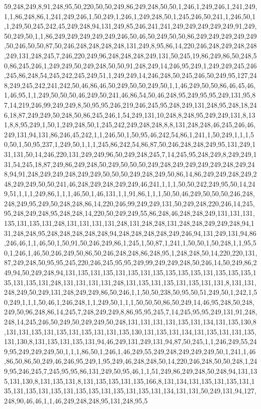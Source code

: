 59,248,249,8,91,248,95,50,220,50,50,249,86,249,248,50,50,1,246,1,249,246,1,241,249,1,1,86,248,86,1,241,249,246,1,50,249,1,246,1,249,248,50,1,245,246,50,241,1,246,50,1,1,249,50,245,242,45,249,248,94,131,249,85,246,241,241,249,249,249,249,249,91,249,50,249,50,1,1,86,249,249,249,249,249,246,50,46,50,249,50,50,86,249,249,249,249,249,50,246,50,50,87,50,246,248,248,248,248,131,249,8,95,86,14,220,246,248,249,248,248,249,131,248,245,7,246,220,249,96,248,248,248,249,131,50,245,19,86,249,86,50,248,50,86,245,246,1,249,249,50,249,248,50,50,91,248,249,14,246,95,249,1,249,249,245,246,245,86,248,54,245,242,245,249,51,1,249,249,14,246,248,50,245,246,50,249,95,127,248,249,245,242,241,242,50,46,86,46,50,249,50,50,249,50,1,1,46,249,50,50,86,46,45,46,1,46,95,1,1,249,50,50,50,46,249,50,241,46,86,54,50,46,248,95,249,95,95,249,131,95,87,14,219,246,99,249,249,8,50,95,95,246,219,246,245,95,248,249,131,248,95,248,18,246,18,87,249,249,50,248,50,86,245,246,1,54,249,131,10,248,8,248,95,249,249,131,8,131,8,8,95,249,1,50,1,249,248,50,1,245,242,249,248,248,8,8,131,248,248,46,245,246,46,249,131,94,131,86,246,45,242,1,1,246,50,1,50,95,46,242,54,86,1,241,1,50,249,1,1,1,50,50,1,50,95,237,1,249,50,1,1,1,245,86,242,54,86,87,50,246,248,248,249,95,131,249,131,131,50,14,246,220,131,249,249,96,50,249,248,245,7,14,245,95,248,249,8,249,249,131,54,245,18,87,249,86,249,248,50,249,50,50,50,249,248,249,249,249,249,248,249,248,94,91,248,249,249,248,249,249,50,50,50,249,248,249,50,86,14,86,249,249,248,249,248,249,249,50,50,241,46,248,249,248,249,249,46,241,1,1,1,50,50,242,249,95,50,14,249,51,1,1,1,249,86,1,1,1,46,50,1,46,131,1,1,91,86,1,1,1,50,50,46,249,50,50,50,246,248,248,249,95,249,50,248,248,86,14,220,246,99,249,249,131,50,249,248,220,246,14,245,95,248,249,248,95,248,248,14,220,50,249,249,55,86,248,46,248,248,249,131,131,131,135,131,135,131,248,131,131,131,131,248,131,248,248,131,248,248,249,249,248,94,131,248,248,95,248,248,248,248,248,94,248,248,248,248,249,246,94,131,249,131,94,86,246,46,1,1,46,50,1,50,91,50,246,249,86,1,245,1,50,87,1,241,1,50,50,1,50,248,1,1,95,50,1,246,1,46,50,246,249,50,86,50,246,248,248,86,248,95,1,248,248,50,14,220,220,131,87,249,248,50,95,95,245,220,246,245,95,95,249,99,249,249,248,50,246,14,50,249,86,249,94,50,249,248,94,131,135,131,135,131,135,131,135,135,135,135,131,135,135,135,135,131,135,131,248,131,131,131,131,248,131,135,131,135,131,135,131,131,8,131,131,248,249,50,249,131,248,249,249,86,50,246,1,1,50,50,238,50,95,50,51,249,50,1,242,1,50,249,1,1,1,50,46,1,246,248,1,1,249,50,1,1,1,50,50,50,86,50,249,14,46,95,248,50,248,249,50,96,248,86,14,245,7,248,249,249,8,86,95,95,245,7,14,245,95,95,249,131,91,248,248,14,245,246,50,249,50,249,249,50,248,131,131,131,131,135,131,134,131,135,130,8,131,131,135,131,135,131,135,131,131,135,130,131,135,131,134,131,135,131,131,135,131,130,8,131,135,131,135,131,94,46,249,131,249,131,94,87,50,245,1,1,246,249,55,249,95,249,249,249,50,1,1,1,86,50,1,246,1,46,249,55,249,248,249,249,249,50,1,241,1,46,86,50,86,50,249,46,246,95,249,1,95,249,46,248,248,50,14,220,246,248,50,50,248,1,249,95,246,245,7,245,95,95,86,131,249,50,95,46,1,1,51,249,86,249,248,50,248,94,131,135,131,130,8,131,135,131,8,131,135,135,131,135,166,8,131,134,131,135,131,135,131,135,131,135,131,135,131,135,135,131,135,131,135,131,134,131,131,50,249,131,94,127,248,90,46,46,1,1,46,249,248,248,95,131,248,95,5